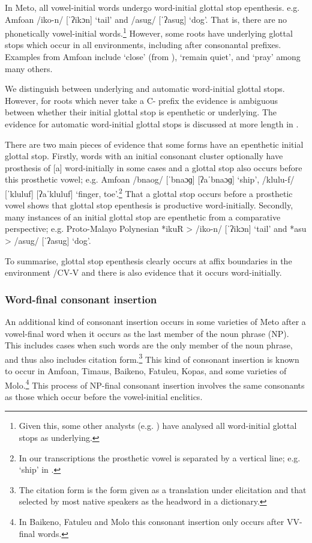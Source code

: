 \documentclass[output=paper]{langscibook}
\begin{document}
In Meto, all vowel-initial words undergo
 word-initial glottal stop epenthesis. e.g. Amfo{\Q}an  /iko-n/  [ˈʔikɔn] `tail' and /asug/ [ˈʔasug] `dog'.
That is, there are no phonetically vowel-initial words.\footnote{Given this, some other analysts (e.g. \cite{st96b,mo21})
have analysed all word-initial glottal stops as underlying.}
However, some roots have underlying glottal stops 
which occur in all environments, including after consonantal prefixes.
Examples from Amfo{\Q}an  include  `close' (from ),
 `remain quiet', and  `pray' among many others.

We distinguish between underlying and automatic word-initial glottal stops.
However, for roots which never take a C- prefix the evidence is ambiguous
between whether their initial glottal stop is epenthetic or underlying.
The evidence for automatic word-initial glottal stops
is discussed at more length in \citet{ed17-GlottalStop}.

There are two main pieces of evidence that some
forms have an epenthetic initial glottal stop.
Firstly, words with an initial consonant cluster optionally
have prosthesis of [a] word-initially in some cases
and a glottal stop also occurs before this prosthetic vowel;
e.g. Amfo{\Q}an /bnaog/ {\ra} [ˈbnaɔɡ] {\tl} [ʔaˈbnaɔɡ] `ship',
\mbox{/klulu-f/} {\ra} [ˈkluluf] {\tl} [ʔaˈkluluf] `finger, toe'.\footnote{%
		In our transcriptions the prosthetic vowel is separated by a vertical line;
		e.g.  `ship' in .
		}
That a glottal stop occurs before a prosthetic vowel
shows that glottal stop epenthesis is productive word-initially.
Secondly, many instances of an initial glottal stop are epenthetic
from a comparative perspective;
e.g. Proto-Malayo Polynesian *ikuR > /iko-n/ {\ra} [ˈʔikɔn] `tail'
and *asu > /asug/ {\ra} [ˈʔasug] `dog'.

To summarise, glottal stop epenthesis clearly
occurs at affix boundaries in the environment /CV-{\gap}V
and there is also evidence that it occurs word-initially.

\subsubsection{Word-final consonant insertion}
An additional kind of consonant insertion
occurs in some varieties of Meto after a vowel-final
word when it occurs as the last member of the noun phrase (NP).
This includes cases when such words are the only member of the noun phrase,
and thus also includes citation form.\footnote{%
		The citation form is the form given as a translation
		under elicitation and that selected by most native speakers
		as the headword in a dictionary.}
This kind of consonant insertion is known to occur in Amfo{\Q}an,
Timaus, Baikeno, Fatule{\Q}u, Kopas, and some varieties of Molo.\footnote{%
		In Baikeno, Fatule{\Q}u and Molo this consonant insertion
		only occurs after VV-final words.}
This process of NP-final consonant insertion involves the same
consonants as those which occur
before the vowel-initial enclitics.
\end{document}
